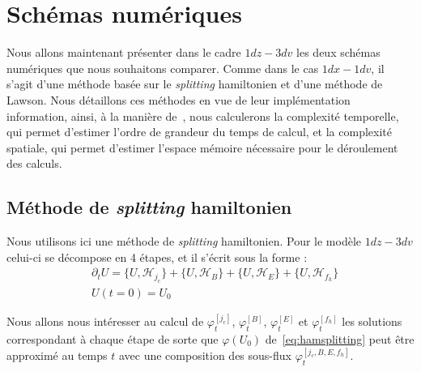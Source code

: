 
\section{Schémas numériques}
\label{sec:3:scheme}

Nous allons maintenant présenter dans le cadre $1dz-3dv$ les deux schémas numériques que nous souhaitons comparer. Comme dans le cas $1dx-1dv$, il s'agit d'une méthode basée sur le \emph{splitting} hamiltonien et d'une méthode de Lawson. Nous détaillons ces méthodes en vue de leur implémentation information, ainsi, à la manière de~\cite{Saramito:2013}, nous calculerons la complexité temporelle, qui permet d'estimer l'ordre de grandeur du temps de calcul, et la complexité spatiale, qui permet d'estimer l'espace mémoire nécessaire pour le déroulement des calculs.

\subsection{Méthode de \emph{splitting} hamiltonien}

Nous utilisons ici une méthode de \emph{splitting} hamiltonien. Pour le modèle $1dz-3dv$ celui-ci se décompose en 4 étapes, et il s'écrit sous la forme :
\begin{equation}
  \begin{aligned}
    & \partial_t U = \{ U,\mathcal{H}_{j_c}\} + \{ U,\mathcal{H}_B\} + \{ U,\mathcal{H}_E\} + \{ U,\mathcal{H}_{f_h}\} \\
    & U(t=0) = U_0
  \end{aligned}
  \label{eq:hamsplitting}
\end{equation}

Nous allons nous intéresser au calcul de $\varphi_t^{[j_c]}$, $\varphi_t^{[B]}$, $\varphi_t^{[E]}$ et $\varphi_t^{[f_h]}$ les solutions correspondant à chaque étape de sorte que $\varphi(U_0)$ de~\eqref{eq:hamsplitting} peut être approximé au temps $t$ avec une composition des sous-flux $\varphi_t^{[j_c,B,E,f_h]}$.


